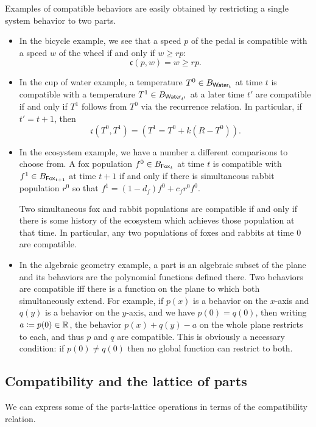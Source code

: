 \begin{ex}
Examples of compatible behaviors are easily obtained by restricting a single system behavior to two parts.
\begin{itemize}
\item In the bicycle example, we see that a speed $p$ of the pedal is compatible with a speed $w$ of the wheel if and only if $w \geq rp$:
$$\mathfrak{c}(p, w) = w \geq rp.$$

\item In the cup of water example, a temperature $T^0 \in B_{\mathsf{{Water}}_t}$ at time $t$ is compatible with a temperature $T^1 \in B_{\mathsf{{Water}}_{t'}}$ at a later time $t'$ are compatible if and only if $T^1$ follows from $T^0$ via the recurrence relation. In particular, if $t' = t + 1$, then
$$\mathfrak{c}(T^0, T^1) = (T^1 = T^0 + k(R - T^0)).$$

\item In the ecosystem example, we have a number a different comparisons to choose from. A fox population $f^0 \in B_{\mathsf{{Fox}}_t}$ at time $t$ is compatible with $f^1 \in B_{\mathsf{{Fox}}_{t + 1}}$ at time $t + 1$ if and only if there is simultaneous rabbit population $r^0$ so that $f^1 = (1 - d_f)f^0 + c_f r^0 f^0$. 

Two simultaneous fox and rabbit populations are compatible if and only if there is some history of the ecosystem which achieves those population at that time. In particular, any two populations of foxes and rabbits at time $0$ are compatible.

\item In the algebraic geometry example, a part is an algebraic subset of the plane and its behaviors are the polynomial functions defined there. Two behaviors are compatible iff there is a function on the plane to which both simultaneously extend. For example, if $p(x)$ is a behavior on the $x$-axis and $q(y)$ is a behavior on the $y$-axis, and we have $p(0)=q(0)$, then writing $a\coloneqq p(0)\in\operatorname{\mathbb{R}}$,  the behavior $p(x)+q(y)-a$ on the whole plane  restricts to each, and thus $p$ and $q$ are compatible. This is obviously a necessary condition: if $p(0)\neq q(0)$ then no global function can restrict to both.
\end{itemize}
\end{ex}

\subsection{Compatibility and the lattice of parts}\label{subsec:compatibility.and.the.lattice.of.parts}
We can express some of the parts-lattice operations in terms of the compatibility relation.

